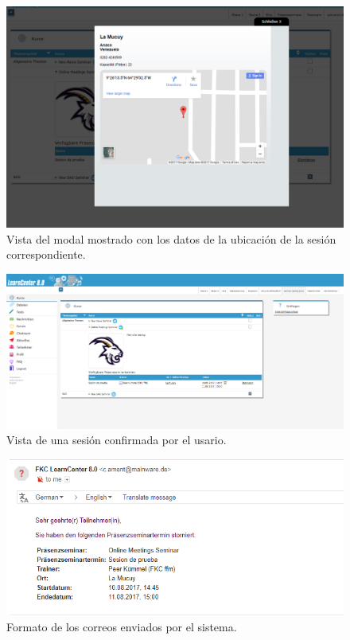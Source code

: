 \begin{figure}[h]
	\begin{center}
		\includegraphics[width=\textwidth]{screenshots/modal_ubicacion.png}
		\caption{Vista del modal mostrado con los datos de la ubicación de la sesión correspondiente.} \label{fig:modalUbicacion}
	\end{center}
\end{figure}

\begin{figure}[h]
	\begin{center}
		\includegraphics[width=\textwidth]{screenshots/user_reservar.png}
		\caption{Vista de una sesión confirmada por el usario.} \label{fig:usuarioSesionConfirmada}
	\end{center}
\end{figure}

\begin{figure}[h]
	\begin{center}
		\includegraphics[width=\textwidth]{screenshots/emails.png}
		\caption{Formato de los correos enviados por el sistema.} \label{fig:emails}
	\end{center}
\end{figure}

